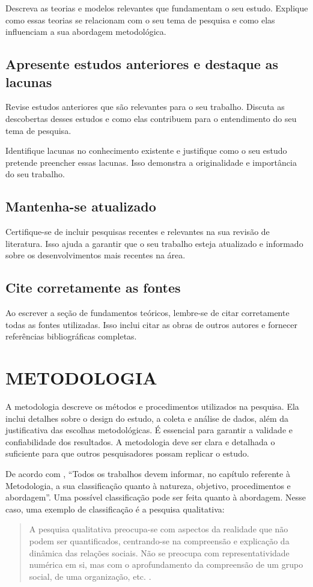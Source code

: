 \documentclass{iftex2024}
\begin{document}
Descreva as teorias e modelos relevantes que fundamentam o seu estudo.
Explique como essas teorias se relacionam com o seu tema de pesquisa e como elas influenciam a sua abordagem metodológica.

\section{Apresente estudos anteriores e destaque as lacunas}

Revise estudos anteriores que são relevantes para o seu trabalho.
Discuta as descobertas desses estudos e como elas contribuem para o entendimento do seu tema de pesquisa.

Identifique lacunas no conhecimento existente e justifique como o seu estudo pretende preencher essas lacunas.
Isso demonstra a originalidade e importância do seu trabalho.

\section{Mantenha-se atualizado}

Certifique-se de incluir pesquisas recentes e relevantes na sua revisão de literatura.
Isso ajuda a garantir que o seu trabalho esteja atualizado e informado sobre os desenvolvimentos mais recentes na área.

\section{Cite corretamente as fontes}

Ao escrever a seção de fundamentos teóricos, lembre-se de citar corretamente todas as fontes utilizadas.
Isso inclui citar as obras de outros autores e fornecer referências bibliográficas completas.

\chapter{METODOLOGIA}

A metodologia descreve os métodos e procedimentos utilizados na pesquisa.
Ela inclui detalhes sobre o design do estudo, a coleta e análise de dados, além da justificativa das escolhas metodológicas.
É essencial para garantir a validade e confiabilidade dos resultados.
A metodologia deve ser clara e detalhada o suficiente para que outros pesquisadores possam replicar o estudo.

De acordo com \citet{ifmg:2021:tcc}, \enquote{Todos os trabalhos devem informar, no capítulo referente à Metodologia, a sua classificação quanto à natureza, objetivo, procedimentos e abordagem}.
Uma possível classificação pode ser feita quanto à abordagem.
Nesse caso, uma exemplo de classificação é a pesquisa qualitativa:
\begin{quote}
A pesquisa qualitativa preocupa-se com aspectos da realidade que não podem ser quantificados, centrando-se na compreensão e explicação da dinâmica das relações sociais.
Não se preocupa com representatividade numérica em si, mas com o aprofundamento da compreensão de um grupo social, de uma organização, etc.
\cite{ifmg:2021:tcc}.
\end{quote}
\end{document}
